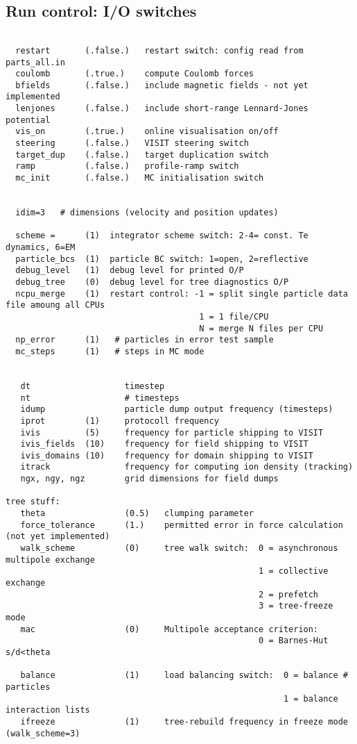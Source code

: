 \documentclass[11pt,psfig]{article}
\begin{document}
\subsection{Run control: I/O switches}

\begin{verbatim}

  restart       (.false.)   restart switch: config read from parts_all.in
  coulomb       (.true.)    compute Coulomb forces
  bfields       (.false.)   include magnetic fields - not yet implemented
  lenjones      (.false.)   include short-range Lennard-Jones potential
  vis_on        (.true.)    online visualisation on/off
  steering      (.false.)   VISIT steering switch
  target_dup    (.false.)   target duplication switch
  ramp          (.false.)   profile-ramp switch
  mc_init       (.false.)   MC initialisation switch


  idim=3   # dimensions (velocity and position updates)

  scheme =      (1)  integrator scheme switch: 2-4= const. Te dynamics, 6=EM
  particle_bcs  (1)  particle BC switch: 1=open, 2=reflective
  debug_level   (1)  debug level for printed O/P
  debug_tree    (0)  debug level for tree diagnostics O/P
  ncpu_merge    (1)  restart control: -1 = split single particle data file amoung all CPUs
                                       1 = 1 file/CPU
                                       N = merge N files per CPU
  np_error      (1)   # particles in error test sample
  mc_steps      (1)   # steps in MC mode


   dt                   timestep
   nt                   # timesteps 
   idump                particle dump output frequency (timesteps)
   iprot        (1)     protocoll frequency
   ivis         (5)     frequency for particle shipping to VISIT
   ivis_fields  (10)    frequency for field shipping to VISIT
   ivis_domains (10)    frequency for domain shipping to VISIT
   itrack               frequency for computing ion density (tracking)
   ngx, ngy, ngz        grid dimensions for field dumps

tree stuff:
   theta                (0.5)   clumping parameter
   force_tolerance      (1.)    permitted error in force calculation (not yet implemented)
   walk_scheme          (0)     tree walk switch:  0 = asynchronous multipole exchange
                                                   1 = collective exchange
                                                   2 = prefetch
                                                   3 = tree-freeze mode
   mac                  (0)     Multipole acceptance criterion:
                                                   0 = Barnes-Hut s/d<theta

   balance              (1)     load balancing switch:  0 = balance # particles
                                                        1 = balance interaction lists
   ifreeze              (1)     tree-rebuild frequency in freeze mode (walk_scheme=3)


\end{verbatim}
\end{document}
